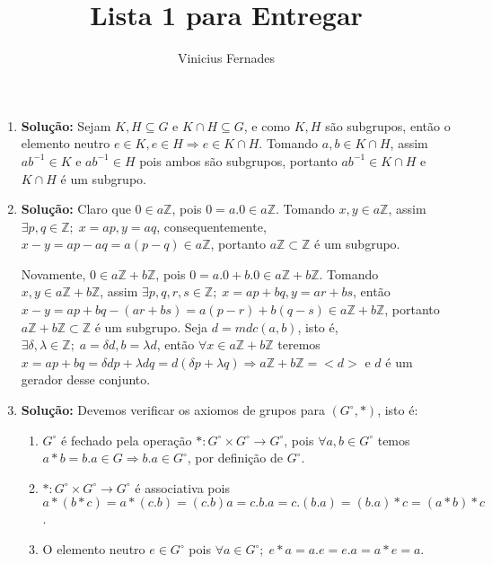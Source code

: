 \documentclass{article}
\begin{document}
	
\title{Lista 1 para Entregar}
\author{Vinicius Fernades}
	
\maketitle
	
\begin{enumerate}
	\item \textbf{Solução:} Sejam $K, H \subseteq G$ e $K \cap H \subseteq G$, e como $K,H$ são subgrupos, então o elemento neutro $e \in K, e\in H \Rightarrow e \in K \cap H$. Tomando $a, b \in K \cap H$, assim $ab^{-1} \in K$ e $ab^{-1} \in H$ pois ambos são subgrupos, portanto $ab^{-1} \in K \cap H$ e $K \cap H$ é um subgrupo.
	
	\item \textbf{Solução:} Claro que $0 \in a\mathbb{Z}$, pois $0 = a.0 \in a\mathbb{Z}$. Tomando $x,y \in a\mathbb{Z}$, assim $\exists p,q \in \mathbb{Z}; \; x=ap, y=aq$, consequentemente, $x-y = ap - aq = a(p-q) \in a \mathbb{Z}$, portanto $a \mathbb{Z} \subset \mathbb{Z}$ é um subgrupo.
	
	Novamente, $0 \in a\mathbb{Z} + b\mathbb{Z}$, pois $0 = a.0 +b.0 \in a\mathbb{Z} + b\mathbb{Z}$. Tomando $x,y \in a\mathbb{Z} + b\mathbb{Z}$, assim $\exists p,q,r,s \in \mathbb{Z}; \; x=ap +bq, y=ar+bs$, então $x-y = ap +bq - (ar+bs) = a(p-r) + b(q-s) \in a\mathbb{Z} + b\mathbb{Z}$, portanto $a\mathbb{Z} + b\mathbb{Z} \subset \mathbb{Z}$ é um subgrupo. Seja $d = mdc(a, b)$, isto é, $\exists \delta, \lambda \in \mathbb{Z}; \; a = \delta d, b = \lambda d$, então $\forall x \in a\mathbb{Z} + b\mathbb{Z}$ teremos $x= ap+bq = \delta dp +\lambda dq = d(\delta p +\lambda q) \Rightarrow a\mathbb{Z} + b\mathbb{Z} = <d>$ e $d$ é um gerador desse conjunto.
	
	\item \textbf{Solução:} Devemos verificar os axiomos de grupos para $(G^{\circ},*)$, isto é:
		\begin{enumerate}
			\item $G^{\circ}$ é fechado pela operação $*: G^{\circ} \times G^{\circ} \to G^{\circ}$, pois $\forall a, b \in G^{\circ}$ temos $a*b = b.a \in G \Rightarrow b.a \in G^{\circ}$, por definição de $G^{\circ}$.
			
			\item $*: G^{\circ} \times G^{\circ} \to G^{\circ}$ é associativa pois $a*(b*c) = a*(c.b) = (c.b)a = c.b.a = c.(b.a) = (b.a)*c = (a*b)*c$.
			
			\item O elemento neutro $e \in G^{\circ}$ pois $\forall a \in G^{\circ}; \; e*a = a.e = e.a = a*e =a$.
			

\end{enumerate}
\end{enumerate}
\end{document}
